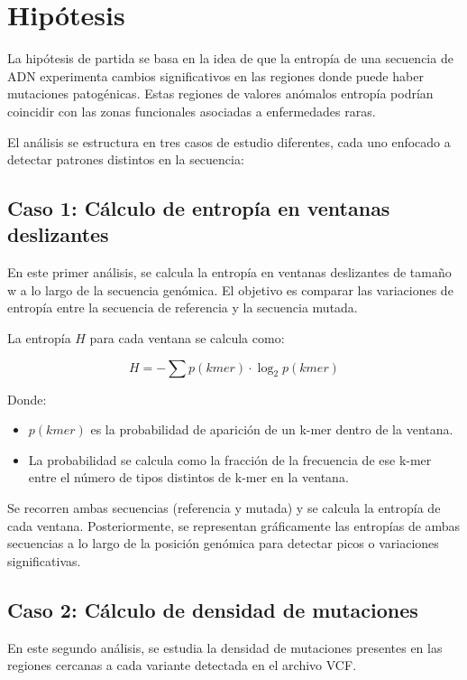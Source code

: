 \documentclass[11pt,spanish,listoffigures,listoftables]{tfgetsinf}
\begin{document}
\section{Hipótesis}

La hipótesis de partida se basa en la idea de que la entropía de una secuencia de \ac{ADN} experimenta cambios significativos en las regiones donde puede haber mutaciones patogénicas. Estas regiones de valores anómalos entropía podrían coincidir con las zonas funcionales asociadas a enfermedades raras. 

El análisis se estructura en tres casos de estudio diferentes, cada uno enfocado a detectar patrones distintos en la secuencia:

\subsection{Caso 1: Cálculo de entropía en ventanas deslizantes}

En este primer análisis, se calcula la entropía en ventanas deslizantes de tamaño w a lo largo de la secuencia genómica. El objetivo es comparar las variaciones de entropía entre la secuencia de referencia y la secuencia mutada.

La entropía $H$ para cada ventana se calcula como:

\[
H = - \sum p(kmer) \cdot \log_2 p(kmer)
\]

Donde:

\begin{itemize}
   \item $p(kmer)$ es la probabilidad de aparición de un k-mer dentro de la ventana.
   \item La probabilidad se calcula como la fracción de la frecuencia de ese k-mer entre el número de tipos distintos de k-mer en la ventana.
\end{itemize}

Se recorren ambas secuencias (referencia y mutada) y se calcula la entropía de cada ventana. Posteriormente, se representan gráficamente las entropías de ambas secuencias a lo largo de la posición genómica para detectar picos o variaciones significativas.


\subsection{Caso 2: Cálculo de densidad de mutaciones}

En este segundo análisis, se estudia la densidad de mutaciones presentes en las regiones cercanas a cada variante detectada en el archivo \ac{VCF}.
\end{document}
